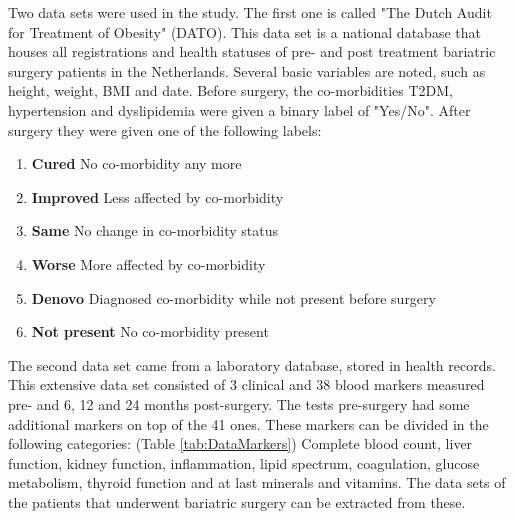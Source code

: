 \documentclass[10pt,a4paper]{article}
\begin{document}
	Two data sets were used in the study. The first one is called "The Dutch Audit for Treatment of Obesity" (DATO). This data set is a national database that houses all registrations and health statuses of pre- and post treatment bariatric surgery patients in the Netherlands. Several basic variables are noted, such as height, weight, BMI and date. Before surgery, the co-morbidities T2DM, hypertension and dyslipidemia were given a binary label of "Yes/No". After surgery they were given one of the following labels:
	
	\begin{enumerate}
		\item \textbf{Cured} No co-morbidity any more		
		\item \textbf{Improved} Less affected by co-morbidity
		\item \textbf{Same} No change in co-morbidity status
		\item \textbf{Worse} More affected by co-morbidity
		\item \textbf{Denovo} Diagnosed co-morbidity while not present before surgery
		\item \textbf{Not present} No co-morbidity present				
	\end{enumerate}

	The second data set came from a laboratory database, stored in health records. This extensive data set consisted of 3 clinical and 38 blood markers measured pre- and 6, 12 and 24 months post-surgery. The tests pre-surgery had some additional markers on top of the 41 ones. These markers can be divided in the following categories: (Table \ref{tab:DataMarkers}) Complete blood count, liver function, kidney function, inflammation, lipid spectrum, coagulation, glucose metabolism, thyroid function and at last minerals and vitamins. The data sets of the patients that underwent bariatric surgery can be extracted from these. 
	
\end{document}
